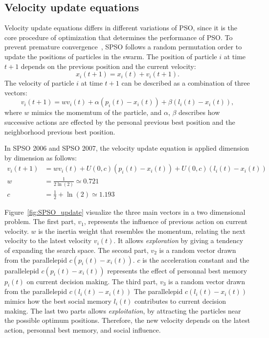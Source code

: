 \subsection{Velocity update equations}

Velocity update equations differs in different variations of PSO, since it is the core procedure of optimization that determines the performance of PSO.
To prevent premature convergence~\cite{Clerc:2012:SPSO2011}, SPSO follows a random permutation order to update the positions of particles in the swarm.
The position of particle $i$ at time $t+1$ depends on the previous position and the current velocity:
\begin{displaymath}
x_i(t+1) = x_i(t) + v_i(t+1).
\end{displaymath}
The velocity of particle $i$ at time $t+1$ can be described as a combination of three vectors:
\begin{displaymath}
v_i(t+1) = w v_i(t) + \alpha (p_i(t) - x_i(t)) + \beta (l_i(t) - x_i(t)),
\end{displaymath}
where $w$ mimics the momemtum of the particle, and $\alpha$, $\beta$ describes how successive actions are effected by the personal previous best position and the neighborhood previous best position.

In SPSO 2006 and SPSO 2007, the velocity update equation is applied dimension by dimension as follows:
\begin{align*}
v_i(t+1) &=  w v_i(t) + U(0,c)(p_i(t) - x_i(t)) + U(0,c) (l_i(t) - x_i(t)) \\
       w &= \frac{1}{2\ln(2)} \simeq 0.721 \\
       c &= \frac{1}{2} + \ln(2) \simeq 1.193
\end{align*}


Figure~\ref{fig:SPSO_update} visualize the three main vectors in a two dimensional problem.
The first part, $v_1$, represents the influence of previous action on current velocity.
$w$ is the inertia weight that resembles the momentum, relating the next velocity to the latest velocity $v_i(t)$.
It allows \textit{exploration} by giving a tendency of expanding the search space.
The second part, $v_2$ is a random vector drawn from the parallelepid $c(p_i(t) - x_i(t))$.
$c$ is the acceleration constant and the parallelepid $c(p_i(t) - x_i(t))$ represents the effect of personnal best memory $p_i(t)$ on current decision making.
The third part, $v_3$ is a random vector drawn from the parallelepid $c(l_i(t) - x_i(t))$
The parallelepid $c(l_i(t) - x_i(t))$ mimics how the best social memory $l_i(t)$ contributes to current decision making.
The last two parts allows \textit{exploitation}, by attracting the particles near the possible optimum positions.
Therefore, the new velocity depends on the latest action, personnal best memory, and social influence.

